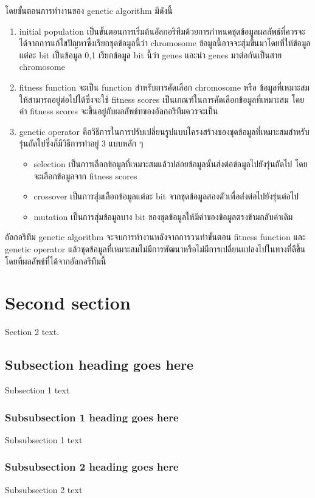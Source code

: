 โดยขั้นตอนการทำงานของ genetic algorithm มีดังนี้ 
\begin{enumerate}
  \item initial population เป็นขั้นตอนการเริ่มต้นอัลกอริทึมด้วยการกำหนดชุดข้อมูลผลลัพธ์ที่ควรจะได้จากการแก้ไขปัญหาซึ่งเรียกชุดข้อมูลนี้ว่า chromosome ข้อมูลนี้อาจจะสุ่มขึ้นมาโดยที่ให้ข้อมูลแต่ละ bit เป็นข้อมูล 0,1 เรียกข้อมูล bit นี้ว่า genes และนำ genes มาต่อกันเป็นสาย chromosome 
  \item fitness function จะเป็น function สำหรับการคัดเลือก chromosome หรือ ข้อมูลที่เหมาะสมให้สามารถอยู่ต่อไปได้ซึ่งจะใช้ fitness scores เป็นเกณฑ์ในการคัดเลือกข้อมูลที่เหมาะสม
  โดยค่า fitness scores จะขึ้นอยู่กับผลลัพธ์ทของอัลกอริทึมควรจะเป็น
  \item genetic operator คือวิธีการในการปรับเปลี่ยนรูปแบบโครงสร้างของชุดข้อมูลที่เหมาะสมสำหรับรุ่นถัดไปซึ่งก็มีวิธีการทำอยู่ 3 แบบหลัก ๆ 
  \begin{itemize}
  \item selection เป็นการเลือกข้อมูลที่เหมาะสมแล้วปล่อยข้อมูลนั้นส่งต่อข้อมูลไปยังรุ่นถัดไป โดยจะเลือกข้อมูลจาก fitness scores
  \item crossover เป็นการสุ่มเลือกข้อมูลแต่ละ bit จากชุดข้อมูลสองตัวเพื่อส่งต่อไปยังรุ่นต่อไป
  \item mutation เป็นการสุ่มข้อมูลบาง bit ของชุดข้อมูลให้มีค่าของข้อมูลตรงข้ามกลับค่าเดิม
\end{itemize}
\end{enumerate}
อัลกอริทึม genetic algorithm จะจบการทำงานหลังจากการวนทำขั้นตอน fitness function และ genetic operator แล้วชุดข้อมูลที่เหมาะสมไม่มีการพัฒนาหรือไม่มีการเปลี่ยนแปลงไปในทางที่ดีขึ้น โดยที่ผลลัพธ์ที่ได้จากอัลกอริทึมนี้

\section{Second section}
Section 2 text.

\subsection{Subsection heading goes here}

Subsection 1 text

\subsubsection{Subsubsection 1 heading goes here}
Subsubsection 1 text

\subsubsection{Subsubsection 2 heading goes here}
Subsubsection 2 text


